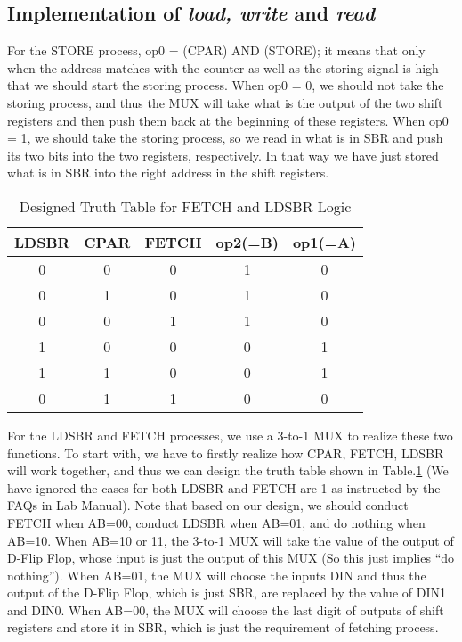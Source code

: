 \documentclass[12pt]{article}
\begin{document}
\subsection{Implementation of \textit{load, write} and \textit{read}}
\label{details}
For the STORE process, op0 = (CPAR) AND (STORE); it means that only when the address matches with the counter as well as the storing signal is high that we should start the storing process. When op0 = 0, we should not take the storing process, and thus the MUX will take what is the output of the two shift registers and then push them back at the beginning of these registers. When op0 = 1, we should take the storing process, so we read in what is in SBR and push its two bits into the two registers, respectively. In that way we have just stored what is in SBR into the right address in the shift registers.

\begin{table}[h]
    \centering
    \begin{tabular}{|c|c|c|c|c|}
        \hline
        LDSBR & CPAR & FETCH & op2(=B) & op1(=A) \\ \hline
        0 & 0 & 0 & 1 & 0 \\ \hline
        0 & 1 & 0 & 1 & 0 \\ \hline
        0 & 0 & 1 & 1 & 0 \\ \hline
        1 & 0 & 0 & 0 & 1 \\ \hline
        1 & 1 & 0 & 0 & 1 \\ \hline
        0 & 1 & 1 & 0 & 0 \\ \hline
    \end{tabular}
    \caption{Designed Truth Table for FETCH and LDSBR Logic}
    \label{truth}
\end{table}


For the LDSBR and FETCH processes, we use a 3-to-1 MUX to realize these two functions. To start with, we have to firstly realize how CPAR, FETCH, LDSBR will work together, and thus we can design the truth table shown in Table.\ref{truth}  (We have ignored the cases for both LDSBR and FETCH are 1 as instructed by the FAQs in Lab Manual). Note that based on our design, we should conduct FETCH when AB=00, conduct LDSBR when AB=01, and do nothing when AB=10. When AB=10 or 11, the 3-to-1 MUX will take the value of the output of D-Flip Flop, whose input is just the output of this MUX (So this just implies “do nothing”). When AB=01, the MUX will choose the inputs DIN and thus the output of the D-Flip Flop, which is just SBR, are replaced by the value of DIN1 and DIN0. When AB=00, the MUX will choose the last digit of outputs of shift registers and store it in SBR, which is just the requirement of fetching process.
\end{document}
